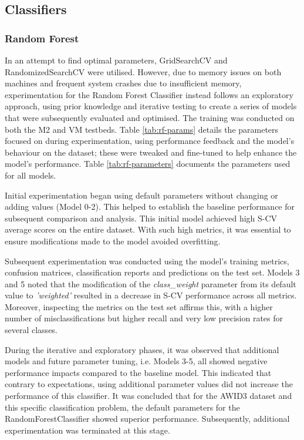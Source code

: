 \subsection{Classifiers}


\subsubsection{Random Forest}
\label{sec:RF}

In an attempt to find optimal parameters, GridSearchCV and RandomizedSearchCV were utilised. However, due to memory issues on both machines and frequent system crashes due to insufficient memory, experimentation for the Random Forest Classifier instead follows an exploratory approach, using prior knowledge and iterative testing to create a series of models that were subsequently evaluated and optimised. The training was conducted on both the M2 and VM testbeds. Table \ref{tab:rf-params} details the parameters focused on during experimentation, using performance feedback and the model's behaviour on the dataset; these were tweaked and fine-tuned to help enhance the model's performance. Table \ref{tab:rf-parameters} documents the parameters used for all models.

\medskip

Initial experimentation began using default parameters without changing or adding values (Model 0-2). This helped to establish the baseline performance for subsequent comparison and analysis. This initial model achieved high S-CV average scores on the entire dataset. With such high metrics, it was essential to ensure modifications made to the model avoided overfitting. 

\medskip

Subsequent experimentation was conducted using the model's training metrics, confusion matrices, classification reports and predictions on the test set. Models 3 and 5 noted that the modification of the \textit{class\_weight} parameter from its default value to \textit{'weighted'} resulted in a decrease in S-CV performance across all metrics. Moreover, inspecting the metrics on the test set affirms this, with a higher number of misclassifications but higher recall and very low precision rates for several classes. 

During the iterative and exploratory phases, it was observed that additional models and future parameter tuning, i.e. Models 3-5, all showed negative performance impacts compared to the baseline model. This indicated that contrary to expectations, using additional parameter values did not increase the performance of this classifier. It was concluded that for the AWID3 dataset and this specific classification problem, the default parameters for the RandomForestClassifier showed superior performance. Subsequently, additional experimentation was terminated at this stage. 

